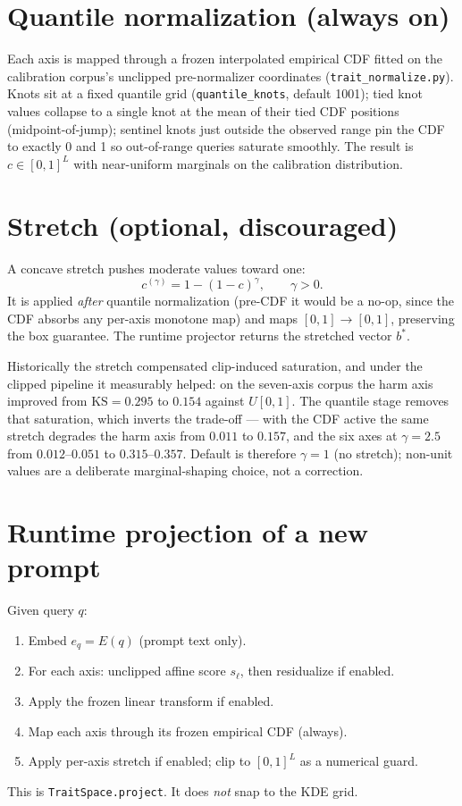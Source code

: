 \documentclass[11pt]{article}
\begin{document}
\section{Quantile normalization (always on)}
Each axis is mapped through a frozen interpolated empirical CDF fitted on
the calibration corpus's unclipped pre-normalizer coordinates
(\texttt{trait\_normalize.py}). Knots sit at a fixed quantile grid
(\texttt{quantile\_knots}, default 1001); tied knot values collapse to a
single knot at the mean of their tied CDF positions (midpoint-of-jump);
sentinel knots just outside the observed range pin the CDF to exactly 0
and 1 so out-of-range queries saturate smoothly. The result is
\(c\in[0,1]^L\) with near-uniform marginals on the calibration
distribution.

\section{Stretch (optional, discouraged)}
A concave stretch pushes moderate values toward one:
\[
c^{(\gamma)}=1-(1-c)^\gamma,\qquad\gamma>0.
\]
It is applied \emph{after} quantile normalization (pre-CDF it would be a
no-op, since the CDF absorbs any per-axis monotone map) and maps
\([0,1]\to[0,1]\), preserving the box guarantee. The runtime projector
returns the stretched vector \(b^\ast\).

Historically the stretch compensated clip-induced saturation, and under
the clipped pipeline it measurably helped: on the seven-axis corpus the
harm axis improved from \(\mathrm{KS}=0.295\) to \(0.154\) against
\(U[0,1]\). The quantile stage removes that saturation, which inverts
the trade-off --- with the CDF active the same stretch degrades the harm
axis from \(0.011\) to \(0.157\), and the six axes at \(\gamma=2.5\)
from \(0.012\text{--}0.051\) to \(0.315\text{--}0.357\). Default is
therefore \(\gamma=1\) (no stretch); non-unit values are a deliberate
marginal-shaping choice, not a correction.

\section{Runtime projection of a new prompt}
Given query \(q\):
\begin{enumerate}[leftmargin=1.4em]
  \item Embed \(e_q=E(q)\) (prompt text only).
  \item For each axis: unclipped affine score \(s_\ell\), then residualize
        if enabled.
  \item Apply the frozen linear transform if enabled.
  \item Map each axis through its frozen empirical CDF (always).
  \item Apply per-axis stretch if enabled; clip to \([0,1]^L\) as a
        numerical guard.
\end{enumerate}
This is \texttt{TraitSpace.project}. It does \emph{not} snap to the KDE grid.
\end{document}
